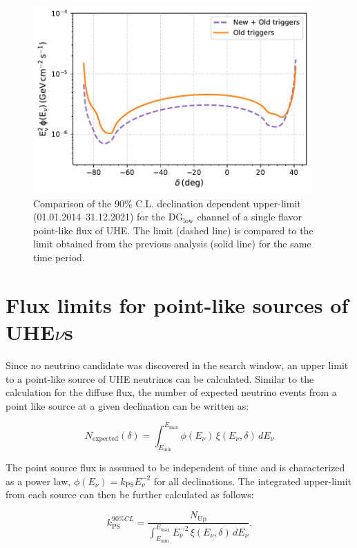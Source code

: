 \begin{figure}[t!]
  \centering
  \includegraphics[width=0.95\textwidth]{thesis_figures/PointLimits/Point_comp_new_old.pdf}
  \caption{Comparison of the 90\% C.L. declination dependent upper-limit (01.01.2014–31.12.2021) for the DG$_{\text{low}}$ channel of a single flavor point-like flux of UHE. The limit (dashed line) is compared to the limit obtained from the previous analysis (solid line) for the same time period.}
  \label{fig:Dec_limit_new old}
\end{figure}

\section{Flux limits for point-like sources of UHE\texorpdfstring{$\nu$s}{}}
\label{sec:pfux_limit}
Since no neutrino candidate was discovered in the search window, an upper limit to a  point-like source of UHE neutrinos can be calculated. Similar to the calculation for the diffuse flux, the number of expected neutrino events from a point like source at a given declination can be written as:

\begin{equation}
  N_{\text{expected}}(\delta) = \int_{E_{\text{min}}}^{E_{\text{max}}}  \phi(E_{\nu}) \, \xi(E_{\nu}, \delta) \, dE_{\nu}
\end{equation}

The point source flux is assumed to be independent of time and is characterized as a power law, $\phi(E_{\nu}) = k_{\text{PS}} E_{\nu}^{-2}$ for all declinations. The integrated upper-limit from each source can then be further calculated as follows:

\begin{equation}
  \label{eq:point_flux_limit}
  k_{\text{PS}}^{90\%CL} = \frac{N_{\text{Up}}}{\int_{E_{\text{min}}}^{E_{\text{max}}} E_{\nu}^{-2} \, \xi(E_{\nu}, \delta) \, dE_{\nu}}.
\end{equation}

